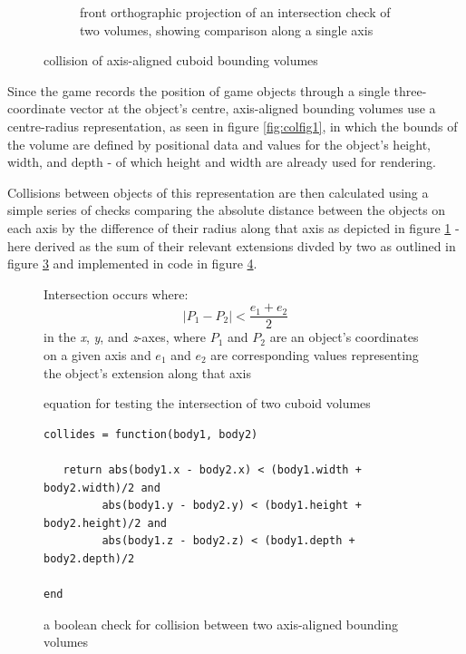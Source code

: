 \documentclass[11pt]{article}
\begin{document}
\begin{figure}[h]
\begin{subfigure}{.45\textwidth}
   \caption{front orthographic projection of an intersection check of two volumes, showing comparison along a single axis}
   \label{fig:colfig2}
\end{subfigure}\hfill
\caption{collision of axis-aligned cuboid bounding volumes}
\label{fig:collision}
\end{figure}

Since the game records the position of game objects through a single three-coordinate vector at the object's
centre, axis-aligned bounding volumes use a centre-radius representation\cite[p. 78]{ericson}, as seen in
figure \ref{fig:colfig1}, in which the bounds of the volume are defined by positional data and values for the
object's height, width, and depth - of which height and width are already used for rendering.

Collisions between objects of this representation are then calculated using a simple series of checks comparing
the absolute distance between the objects on each axis by the difference of their radius along that axis as
depicted in figure \ref{fig:colfig2} - here derived as the sum of their relevant extensions divded by two as
outlined in figure \ref{fig:colequation} and implemented in code in figure \ref{fig:codecollide}.

\begin{figure}
   \centering
   Intersection occurs where:
   \begin{equation}
      |P_1 - P_2| < \frac{e_1 + e_2} {2}
   \end{equation}
   in the \textit{x}, \textit{y}, and \textit{z}-axes, where $P_1$ and $P_2$ are an object's coordinates on a given axis and
   $e_1$ and $e_2$ are corresponding values representing the object's extension along that axis
   \caption{equation for testing the intersection of two cuboid volumes}
   \label{fig:colequation}
\end{figure}

\begin{figure}[h]
   \begin{lstlisting}
collides = function(body1, body2)

   return abs(body1.x - body2.x) < (body1.width + body2.width)/2 and
         abs(body1.y - body2.y) < (body1.height + body2.height)/2 and
         abs(body1.z - body2.z) < (body1.depth + body2.depth)/2

end
   \end{lstlisting}
   \caption{a boolean check for collision between two axis-aligned bounding volumes}
   \label{fig:codecollide}
\end{figure}
\end{document}
